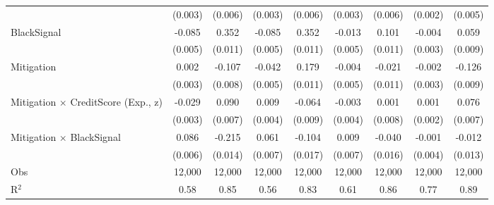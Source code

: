 {\begin{tabular}{l*{8}{c}}
                                             &  (0.003)         &  (0.006)         &  (0.003)         &  (0.006)         &  (0.003)         &  (0.006)         &  (0.002)         &  (0.005)         \\
BlackSignal                                  &   -0.085\sym{***}&    0.352\sym{***}&   -0.085\sym{***}&    0.352\sym{***}&   -0.013\sym{***}&    0.101\sym{***}&   -0.004         &    0.059\sym{***}\\
                                             &  (0.005)         &  (0.011)         &  (0.005)         &  (0.011)         &  (0.005)         &  (0.011)         &  (0.003)         &  (0.009)         \\
Mitigation                                   &    0.002         &   -0.107\sym{***}&   -0.042\sym{***}&    0.179\sym{***}&   -0.004         &   -0.021\sym{*}  &   -0.002         &   -0.126\sym{***}\\
                                             &  (0.003)         &  (0.008)         &  (0.005)         &  (0.011)         &  (0.005)         &  (0.011)         &  (0.003)         &  (0.009)         \\
Mitigation $\times$ CreditScore (Exp., z)    &   -0.029\sym{***}&    0.090\sym{***}&    0.009\sym{**} &   -0.064\sym{***}&   -0.003         &    0.001         &    0.001         &    0.076\sym{***}\\
                                             &  (0.003)         &  (0.007)         &  (0.004)         &  (0.009)         &  (0.004)         &  (0.008)         &  (0.002)         &  (0.007)         \\
Mitigation $\times$ BlackSignal              &    0.086\sym{***}&   -0.215\sym{***}&    0.061\sym{***}&   -0.104\sym{***}&    0.009         &   -0.040\sym{**} &   -0.001         &   -0.012         \\
                                             &  (0.006)         &  (0.014)         &  (0.007)         &  (0.017)         &  (0.007)         &  (0.016)         &  (0.004)         &  (0.013)         \\
\midrule
Obs                                          &   12,000         &   12,000         &   12,000         &   12,000         &   12,000         &   12,000         &   12,000         &   12,000         \\
R$^2$                                        &     0.58         &     0.85         &     0.56         &     0.83         &     0.61         &     0.86         &     0.77         &     0.89         \\

\end{tabular}}

